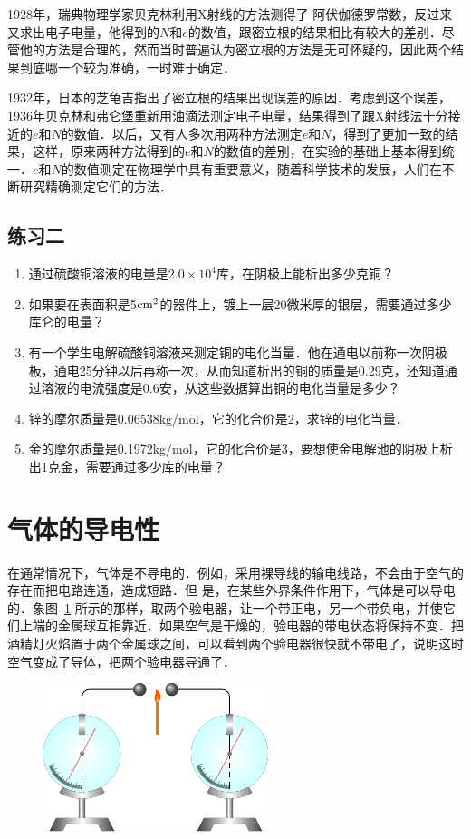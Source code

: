 1928年，瑞典物理学家贝克林利用X射线的方法测得了
阿伏伽德罗常数，反过来又求出电子电量，他得到的$N$和$e$的数值，跟密立根的结果相比有较大的差别．尽管他的方法是合理的，然而当时普遍认为密立根的方法是无可怀疑的，因此两个结果到底哪一个较为准确，一时难于确定．

1932年，日本的芝龟吉指出了密立根的结果出现误差的原因．考虑到这个误差，1936年贝克林和弗仑堡重新用油滴法测定电子电量，结果得到了跟X射线法十分接近的$e$和$N$的数值．以后，又有人多次用两种方法测定$e$和$N$，得到了更加一致的结果，这样，原来两种方法得到的$e$和$N$的数值的差别，在实验的基础上基本得到统一．$e$和$N$的数值测定在物理学中具有重要意义，随着科学技术的发展，人们在不断研究精确测定它们的方法．

\subsection*{练习二}
\begin{enumerate}
    \item 通过硫酸铜溶液的电量是$2.0\times10^4$库，在阴极上能析出多少克铜？
    \item 如果要在表面积是5${\rm cm^2}$的器件上，镀上一层20微米厚的银层，需要通过多少库仑的电量？
    \item 有一个学生电解硫酸铜溶液来测定铜的电化当量．他在通电以前称一次阴极板，通电25分钟以后再称一次，从而知道析出的铜的质量是0.29克，还知道通过溶液的电流强度是0.6安，从这些数据算出铜的电化当量是多少？
    \item 锌的摩尔质量是0.06538kg/mol，它的化合价是2，求锌的电化当量．
    \item 金的摩尔质量是0.1972kg/mol，它的化合价是3，要想使金电解池的阴极上析出1克金，需要通过多少库的电量？
\end{enumerate}


\section{气体的导电性}
在通常情况下，气体是不导电的．例如，采用裸导线的输电线路，不会由于空气的存在而把电路连通，造成短路．但
是，在某些外界条件作用下，气体是可以导电的．象图~\ref{fig_B_8-4} 所示的那样，取两个验电器，让一个带正电，另一个带负电，并使它们上端的金属球互相靠近．如果空气是干燥的，验电器的带电状态将保持不变．把酒精灯火焰置于两个金属球之间，可以看到两个验电器很快就不带电了，说明这时空气变成了导体，把两个验电器导通了．
\begin{figure}[htbp]
    \centering
    \includegraphics{fig/B/8-4.pdf}
    \caption{}\label{fig_B_8-4}
\end{figure}

